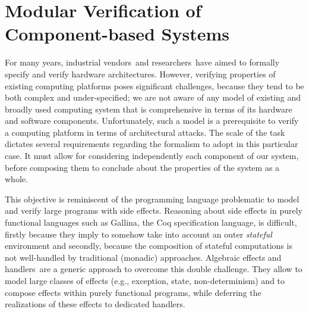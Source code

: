 \chapter{Modular Verification of Component-based Systems}
\label{chapter:freespec}


\vspace{1cm}%
\noindent
%
For many years, industrial vendors\,\cite{reid2017arm,leslie2015sgx} and
researchers\,\cite{chong2016report,choi2017kami} have aimed to formally specify
and verify hardware architectures.
%
However, verifying properties of existing computing platforms poses significant
challenges, because they tend to be both complex and under-specified; we are not
aware of any model of existing and broadly used computing system that is
comprehensive in terms of its hardware and software components.
%
Unfortunately, such a model is a prerequisite to verify a computing platform in
terms of architectural attacks.
%
The scale of the task dictates several requirements regarding the formalism to
adopt in this particular case.
%
It must allow for considering independently each component of our system, before
composing them to conclude about the properties of the system as a whole.

This objective is reminiscent of the programming language problematic to model
and verify large programs with side effects.
%
Reasoning about side effects in purely functional languages such as {\textsc
  Gallina}, the Coq specification language, is difficult, firstly because they
imply to somehow take into account an outer \emph{stateful} environment and
secondly, because the composition of stateful computations is not well-handled
by traditional (monadic) approaches.
%
Algebraic effects and handlers\,\cite{bauer2015effects} are a generic approach
to overcome this double challenge.
%
They allow to model large classes of effects (e.g., exception, state,
non-determinism) and to compose effects within purely functional programs, while
deferring the realizations of these effects to dedicated handlers.

